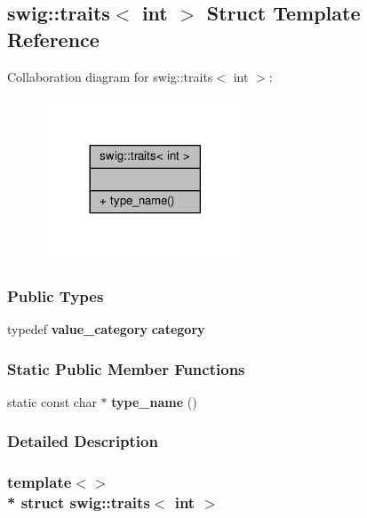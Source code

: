 \subsection{swig\+:\+:traits$<$ int $>$ Struct Template Reference}
\label{structswig_1_1traits_3_01int_01_4}


Collaboration diagram for swig\+:\+:traits$<$ int $>$\+:
\nopagebreak
\begin{figure}[H]
\begin{center}
\leavevmode
\includegraphics[width=173pt]{d2/de5/structswig_1_1traits_3_01int_01_4__coll__graph}
\end{center}
\end{figure}
\subsubsection*{Public Types}
\begin{DoxyCompactItemize}
\item 
typedef {\bf value\+\_\+category} {\bf category}
\end{DoxyCompactItemize}
\subsubsection*{Static Public Member Functions}
\begin{DoxyCompactItemize}
\item 
static const char $\ast$ {\bf type\+\_\+name} ()
\end{DoxyCompactItemize}


\subsubsection{Detailed Description}
\subsubsection*{template$<$$>$\\*
struct swig\+::traits$<$ int $>$}



